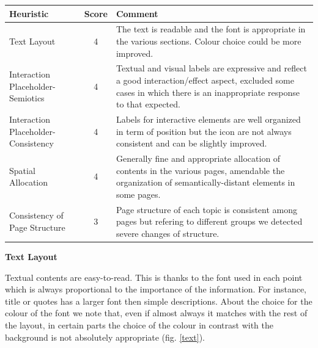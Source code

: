 \begin{table}[H]
  \begin{center}
    \label{tab:table1}
    \begin{tabular}{||l|c|p{8cm}||} %
      \textbf{Heuristic} & \textbf{Score} & \textbf{Comment}\\
      
      \hline
      Text Layout & 4 & The text is readable and the font is appropriate in the various sections. Colour choice could be more improved.\\
      \hline
      Interaction Placeholder-Semiotics & 4 & Textual and visual labels are expressive and reflect a good interaction/effect aspect, excluded some cases in which there is an inappropriate response to that expected.\\
      \hline
      Interaction Placeholder-Consistency & 4 & Labels for interactive elements are well organized in term of position but the icon are not always consistent and can be slightly improved.\\
      \hline
      Spatial Allocation & 4 & Generally fine and appropriate allocation of contents in the various pages, amendable the organization of semantically-distant elements in some pages.\\
      \hline
      Consistency of Page Structure & 3 & Page structure of each topic is consistent among pages but refering to different groups we detected severe changes of structure.\\

    \end{tabular}
  \end{center}
\end{table}
\pagebreak

\textbf{Text Layout}\par
Textual contents are easy-to-read. This is thanks to the font used in each point which is always proportional to the importance of the information. For instance, title or quotes has a larger font then simple descriptions. About the choice for the colour of the font we note that, even if almost always it matches with the rest of the layout, in certain parts the choice of the colour in contrast with the background is not absolutely appropriate (fig. \ref{text}).
\medskip

